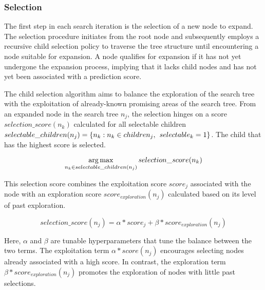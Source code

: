 \subsubsection{Selection}
\label{s_Methodology_Search_Selection}
The first step in each search iteration is the selection of a new node to expand. The selection procedure initiates from the root node and subsequently employs a recursive child selection policy to traverse the tree structure until encountering a node suitable for expansion. A node qualifies for expansion if it has not yet undergone the expansion process, implying that it lacks child nodes and has not yet been associated with a prediction score.

The child selection algorithm aims to balance the exploration of the search tree with the exploitation of already-known promising areas of the search tree. From an expanded node in the search tree $n_j$, the selection hinges on a score $selection\_score(n_k)$ calculated for all selectable children $selectable\_children(n_j) = \{n_k: n_k \in children_j, \hspace{1.5mm} selectable_k = 1\}$. The child that has the highest score is selected.

\begin{equation}
    \operatorname*{arg\,max}_{n_k \in selectable\_children(n_j)} selection\_score(n_k)
\end{equation}

This selection score combines the exploitation score $score_j$ associated with the node with an exploration score $score_{exploration}(n_j)$ calculated based on its level of past exploration.

\begin{equation}
    selection\_score(n_j) = \alpha * score_j + \beta * score_{exploration}(n_j)
\end{equation}

Here, $\alpha$ and $\beta$ are tunable hyperparameters that tune the balance between the two terms. The exploitation term $\alpha * score(n_j)$ encourages selecting nodes already associated with a high score. In contrast, the exploration term $\beta * score_{exploration}(n_j)$ promotes the exploration of nodes with little past selections.

